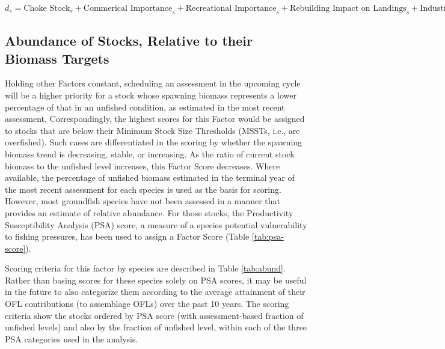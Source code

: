 \documentclass[11pt,
  english,
  a4paper,
]{article}
\begin{document}
\begin{centering}

$d_s = \text{Choke Stock}_s + \text{Commerical Importance}_s + \text{Recreational Importance}_s + \text{Rebuilding Impact on Landings}_s + \text{Industry Concern}_s$

\end{centering}


\hypertarget{abundance-of-stocks-relative-to-their-biomass-targets}{%
\subsection{Abundance of Stocks, Relative to their Biomass Targets}\label{abundance-of-stocks-relative-to-their-biomass-targets}}

\leavevmode\tagmcend\tagstructend


Holding other Factors constant, scheduling an assessment in the upcoming cycle will be a higher priority for a stock whose spawning biomass represents a lower percentage of that in an unfished condition, as estimated in the most recent assessment. Correspondingly, the highest scores for this Factor would be assigned to stocks that are below their Minimum Stock Size Thresholds (MSSTs, i.e., are overfished). Such cases are differentiated in the scoring by whether the spawning biomass trend is decreasing, stable, or increasing. As the ratio of current stock biomass to the unfished level increases, this Factor Score decreases. Where available, the percentage of unfished biomass estimated in the terminal year of the most recent assessment for each species is used as the basis for scoring. However, most groundfish species have not been assessed in a manner that provides an estimate of relative abundance. For those stocks, the Productivity Susceptibility Analysis (PSA) score, a measure of a species potential vulnerability to fishing pressures, has been used to assign a Factor Score (Table \ref{tab:psa-score}).

\leavevmode\tagmcend\tagstructend\par


Scoring criteria for this factor by species are described in Table \ref{tab:abund}. Rather than basing scores for these species solely on PSA scores, it may be useful in the future to also categorize them according to the average attainment of their OFL contributions (to assemblage OFLs) over the past 10 years. The scoring criteria show the stocks ordered by PSA score (with assessment-based fraction of unfished levels) and also by the fraction of unfished level, within each of the three PSA categories used in the analysis.
\end{document}
